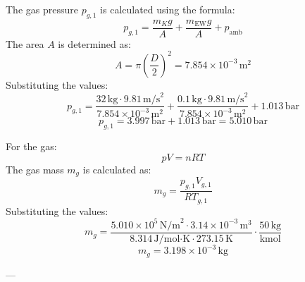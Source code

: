 The gas pressure \( p_{g,1} \) is calculated using the formula:  
\[
p_{g,1} = \frac{m_{K} g}{A} + \frac{m_{\text{EW}} g}{A} + p_{\text{amb}}
\]  
The area \( A \) is determined as:  
\[
A = \pi \left(\frac{D}{2}\right)^2 = 7.854 \times 10^{-3} \, \text{m}^2
\]  
Substituting the values:  
\[
p_{g,1} = \frac{32 \, \text{kg} \cdot 9.81 \, \text{m/s}^2}{7.854 \times 10^{-3} \, \text{m}^2} + \frac{0.1 \, \text{kg} \cdot 9.81 \, \text{m/s}^2}{7.854 \times 10^{-3} \, \text{m}^2} + 1.013 \, \text{bar}
\]  
\[
p_{g,1} = 3.997 \, \text{bar} + 1.013 \, \text{bar} = 5.010 \, \text{bar}
\]  

For the gas:  
\[
p V = n R T
\]  
The gas mass \( m_g \) is calculated as:  
\[
m_g = \frac{p_{g,1} V_{g,1}}{R T_{g,1}}
\]  
Substituting the values:  
\[
m_g = \frac{5.010 \times 10^5 \, \text{N/m}^2 \cdot 3.14 \times 10^{-3} \, \text{m}^3}{8.314 \, \text{J/mol·K} \cdot 273.15 \, \text{K}} \cdot \frac{50 \, \text{kg}}{\text{kmol}}
\]  
\[
m_g = 3.198 \times 10^{-3} \, \text{kg}
\]  

---